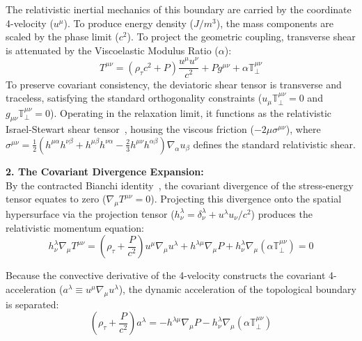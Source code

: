 The relativistic inertial mechanics of this boundary are carried by the coordinate 4-velocity ($u^\mu$). To produce energy density ($J/m^3$), the mass components are scaled by the phase limit ($c^2$). To project the geometric coupling, transverse shear is attenuated by the Viscoelastic Modulus Ratio ($\alpha$):
\begin{equation}
    T^{\mu\nu} = \left(\rho_\tau c^2 + P\right)\frac{u^\mu u^\nu}{c^2} + P g^{\mu\nu} + \alpha \mathbb{T}_{\perp}^{\mu\nu}
\end{equation}
To preserve covariant consistency, the deviatoric shear tensor is transverse and traceless, satisfying the standard orthogonality constraints ($u_\mu \mathbb{T}_{\perp}^{\mu\nu} = 0$ and $g_{\mu\nu}\mathbb{T}_{\perp}^{\mu\nu} = 0$). Operating in the relaxation limit, it functions as the relativistic Israel-Stewart shear tensor~\cite{Israel1979}, housing the viscous friction ($-2\mu\sigma^{\mu\nu}$), where $\sigma^{\mu\nu} = \frac{1}{2}(h^{\mu\alpha}h^{\nu\beta} + h^{\mu\beta}h^{\nu\alpha} - \frac{2}{3}h^{\mu\nu}h^{\alpha\beta})\nabla_\alpha u_\beta$ defines the standard relativistic shear.

\vspace{0.2 cm}

\textbf{2. The Covariant Divergence Expansion:} \\
By the contracted Bianchi identity~\cite{Bianchi1892}, the covariant divergence of the stress-energy tensor equates to zero ($\nabla_\mu T^{\mu\nu} = 0$). Projecting this divergence onto the spatial hypersurface via the projection tensor ($h^\lambda_\nu = \delta^\lambda_\nu + u^\lambda u_\nu / c^2$) produces the relativistic momentum equation:
\begin{equation}
    h^\lambda_\nu \nabla_\mu T^{\mu\nu} = \left(\rho_\tau + \frac{P}{c^2}\right) u^\mu \nabla_\mu u^\lambda + h^{\lambda\mu} \nabla_\mu P + h^\lambda_\nu \nabla_\mu (\alpha \mathbb{T}_{\perp}^{\mu\nu}) = 0
\end{equation}

Because the convective derivative of the 4-velocity constructs the covariant 4-acceleration ($a^\lambda \equiv u^\mu \nabla_\mu u^\lambda$), the dynamic acceleration of the topological boundary is separated:
\begin{equation}
    \left(\rho_\tau + \frac{P}{c^2}\right) a^\lambda = -h^{\lambda\mu} \nabla_\mu P - h^\lambda_\nu \nabla_\mu (\alpha \mathbb{T}_{\perp}^{\mu\nu}) \label{eq:defect_euler_relativistic}
\end{equation}

